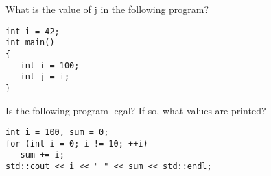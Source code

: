 %
%
\begin{question}
What is the value of j in the following program?
\begin{lstlisting}
int i = 42;
int main()
{
   int i = 100;
   int j = i;
}
\end{lstlisting}
\end{question}

\begin{question}
Is the following program legal? If so, what values are printed?
\begin{lstlisting}
int i = 100, sum = 0;
for (int i = 0; i != 10; ++i)
   sum += i;
std::cout << i << " " << sum << std::endl;
\end{lstlisting}
\end{question}
